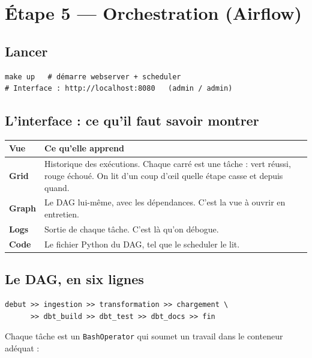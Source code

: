 \documentclass[11pt,a4paper]{article}
\newcommand{\cmd}[1]{\texttt{\small #1}}
\begin{document}
\newpage
\section{Étape 5 — Orchestration (Airflow)}

\subsection{Lancer}

\begin{lstlisting}[style=sh]
make up   # démarre webserver + scheduler
# Interface : http://localhost:8080   (admin / admin)
\end{lstlisting}

\subsection{L'interface : ce qu'il faut savoir montrer}

\begin{center}
\begin{tabularx}{\textwidth}{@{}lX@{}}
\toprule
\textbf{Vue} & \textbf{Ce qu'elle apprend} \\
\midrule
\textbf{Grid}  & Historique des exécutions. Chaque carré est une tâche : vert réussi, rouge échoué. On lit d'un coup d'{\oe}il quelle étape casse et depuis quand. \\
\textbf{Graph} & Le DAG lui-même, avec les dépendances. C'est la vue à ouvrir en entretien. \\
\textbf{Logs}  & Sortie de chaque tâche. C'est là qu'on débogue. \\
\textbf{Code}  & Le fichier Python du DAG, tel que le scheduler le lit. \\
\bottomrule
\end{tabularx}
\end{center}

\subsection{Le DAG, en six lignes}

\begin{lstlisting}[style=py]
debut >> ingestion >> transformation >> chargement \
      >> dbt_build >> dbt_test >> dbt_docs >> fin
\end{lstlisting}

Chaque tâche est un \cmd{BashOperator} qui soumet un travail dans le
conteneur adéquat :
\end{document}
